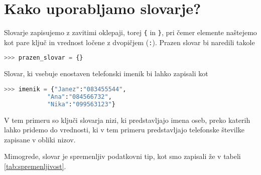 \section{Kako uporabljamo slovarje?}

Slovarje zapisujemo z zavitimi oklepaji, torej \texttt{\{} in \texttt{\}}, pri čemer elemente naštejemo kot pare ključ in vrednost ločene z dvopičjem (\texttt{:}). Prazen slovar bi naredili takole
\begin{lstlisting}[language=Python]
>>> prazen_slovar = {}
\end{lstlisting}
Slovar, ki vsebuje enostaven telefonski imenik bi lahko zapisali kot
\begin{lstlisting}[language=Python]
>>> imenik = {"Janez":"083455544", 
            "Ana":"084566732", 
            "Nika":"099563123"}
\end{lstlisting}
V tem primeru so ključi slovarja nizi, ki predstavljajo imena oseb, preko katerih lahko pridemo do vrednosti, ki v tem primeru predstavljajo telefonske številke zapisane v obliki nizov. 

Mimogrede, slovar je spremenljiv podatkovni tip, kot smo zapisali že v tabeli \ref{tab:spremenljivost}.

